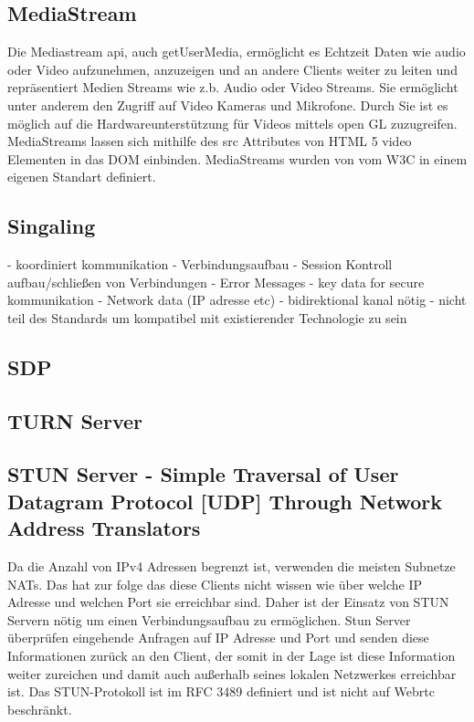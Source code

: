 \subsection{MediaStream}
Die Mediastream api, auch getUserMedia, ermöglicht es Echtzeit Daten wie audio oder Video aufzunehmen, anzuzeigen und an andere Clients weiter zu leiten und repräsentiert Medien Streams wie z.b. Audio oder Video Streams. Sie ermöglicht unter anderem den Zugriff auf Video Kameras und Mikrofone. Durch Sie ist es möglich auf die Hardwareunterstützung für Videos mittels open GL zuzugreifen. MediaStreams lassen sich mithilfe des src Attributes von HTML 5 video Elementen in das DOM einbinden. MediaStreams wurden von vom W3C in einem eigenen Standart definiert.\cite{w3MediaStream} 

\subsection{Singaling}
- koordiniert kommunikation
- Verbindungsaufbau
	- Session Kontroll aufbau/schließen von Verbindungen
	- Error Messages
	- key data for secure kommunikation
	- Network data (IP adresse etc)
	- bidirektional kanal nötig
	- nicht teil des Standards um kompatibel mit existierender Technologie zu sein


\subsection{SDP}

\subsection{TURN Server}

\subsection{STUN Server - Simple Traversal of User Datagram Protocol [UDP] Through Network Address Translators}

Da die Anzahl von IPv4 Adressen begrenzt ist, verwenden die meisten Subnetze NATs. Das hat zur folge das diese Clients nicht wissen wie über welche IP Adresse und welchen Port sie erreichbar sind. Daher ist der Einsatz von STUN Servern nötig um einen Verbindungsaufbau zu ermöglichen. Stun Server überprüfen eingehende Anfragen auf IP Adresse und Port und senden diese Informationen zurück an den Client, der somit in der Lage ist diese Information weiter zureichen und damit auch außerhalb seines lokalen Netzwerkes erreichbar ist. Das STUN-Protokoll ist im RFC 3489 \cite{rfcStun} definiert und ist nicht auf Webrtc beschränkt.


